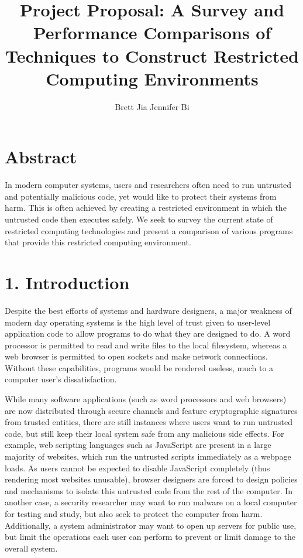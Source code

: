 \documentclass{proc}
\begin{document}
\title{Project Proposal: A Survey and Performance Comparisons of Techniques to Construct Restricted Computing Environments}

\author{Brett Jia \hspace{1em} Jennifer Bi}

\maketitle

\section*{Abstract}

In modern computer systems, users and researchers often need to run untrusted and potentially malicious code, yet would like to protect their systems from harm. This is often achieved by creating a restricted environment in which the untrusted code then executes safely. We seek to survey the current state of restricted computing technologies and present a comparison of various programs that provide this restricted computing environment.

\section*{1. Introduction}

Despite the best efforts of systems and hardware designers, a major weakness of modern day operating systems is the high level of trust given to user-level application code to allow programs to do what they are designed to do. A word processor is permitted to read and write files to the local filesystem, whereas a web browser is permitted to open sockets and make network connections. Without these capabilities, programs would be rendered useless, much to a computer user's dissatisfaction.

While many software applications (such as word processors and web browsers) are now distributed through secure channels and feature cryptographic signatures from trusted entities, there are still instances where users want to run untrusted code, but still keep their local system safe from any malicious side effects. For example, web scripting languages such as JavaScript are present in a large majority of websites, which run the untrusted scripts immediately as a webpage loads. As users cannot be expected to disable JavaScript completely (thus rendering most websites unusable), browser designers are forced to design policies and mechanisms to isolate this untrusted code from the rest of the computer. In another case, a security researcher may want to run malware on a local computer for testing and study, but also seek to protect the computer from harm. Additionally, a system administrator may want to open up servers for public use, but limit the operations each user can perform to prevent or limit damage to the overall system.
\end{document}
